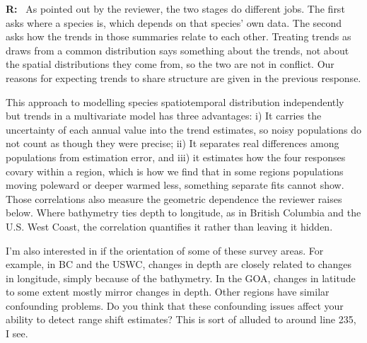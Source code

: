 \documentclass[11pt]{article}
\newcommand{\reviewer}[1]{\par\medskip\noindent\textcolor{revcolor}{#1}\par}
\newenvironment{reply}
{\par\smallskip\begingroup\color{replycolor}\noindent\textbf{R:}\ }
{\endgroup\par\medskip}
\begin{document}
\begin{reply}
As pointed out by the reviewer, the two stages do different jobs. The first asks where a species is, which depends on that species' own data. The second asks how the trends in those summaries relate to each other. Treating trends as draws from a common distribution says something about the trends, not about the spatial distributions they come from, so the two are not in conflict. Our reasons for expecting trends to share structure are given in the previous response.

This approach to modelling species spatiotemporal distribution independently but trends in a multivariate model has three advantages: i) It carries the uncertainty of each annual value into the trend estimates, so noisy populations do not count as though they were precise; ii) It separates real differences among populations from estimation error, and iii) it estimates how the four responses covary within a region, which is how we find that in some regions populations moving poleward or deeper warmed less, something separate fits cannot show. Those correlations also measure the geometric dependence the reviewer raises below. Where bathymetry ties depth to longitude, as in British Columbia and the U.S. West Coast, the correlation quantifies it rather than leaving it hidden.
\end{reply}


\reviewer{I'm also interested in if the orientation of some of these survey areas. For example, in BC and the USWC, changes in depth are closely related to changes in longitude, simply because of the bathymetry. In the GOA, changes in latitude to some extent mostly mirror changes in depth. Other regions have similar confounding problems. Do you think that these confounding issues affect your ability to detect range shift estimates? This is sort of alluded to around line 235, I see.
}
\end{document}
